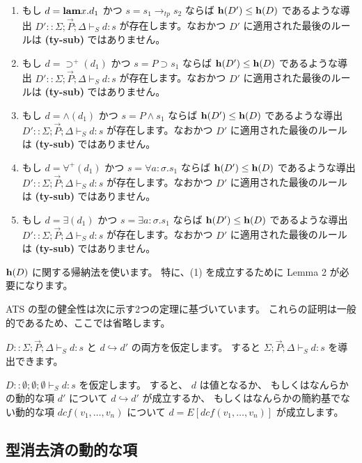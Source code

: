 \documentclass[submit,techreq,noauthor,onecolumn]{ipsj}
\begin{document}
\begin{enumerate}
  \item もし $d = {\bf lam} x.d_1$ かつ $s = s_1 \rightarrow_{tp} s_2$ ならば ${\bf h}(D') \leq {\bf h}(D)$ であるような導出 $D'::\Sigma; \vec{P}; \Delta \vdash_S d:s$ が存在します。なおかつ $D'$ に適用された最後のルールは {\bf (ty-sub)} ではありません。
  \item もし $d = \supset^+(d_1)$ かつ $s = P \supset s_1$ ならば ${\bf h}(D') \leq {\bf h}(D)$ であるような導出 $D' :: \Sigma; \vec{P}; \Delta \vdash_S d:s$ が存在します。なおかつ $D'$ に適用された最後のルールは {\bf (ty-sub)} ではありません。
  \item もし $d = \wedge(d_1)$ かつ $s = P \wedge s_1$ ならば ${\bf h}(D') \leq {\bf h}(D)$ であるような導出 $D' :: \Sigma; \vec{P}; \Delta \vdash_S d:s$ が存在します。なおかつ $D'$ に適用された最後のルールは {\bf (ty-sub)} ではありません。
  \item もし $d = \forall^+(d_1)$ かつ $s = \forall a:\sigma.s_1$ ならば ${\bf h}(D') \leq {\bf h}(D)$ であるような導出 $D' :: \Sigma; \vec{P}; \Delta \vdash_S d:s$ が存在します。なおかつ $D'$ に適用された最後のルールは {\bf (ty-sub)} ではありません。
  \item もし $d = \exists(d_1)$ かつ $s = \exists a:\sigma.s_1$ ならば ${\bf h}(D') \leq {\bf h}(D)$ であるような導出 $D' :: \Sigma; \vec{P}; \Delta \vdash_S d:s$ が存在します。なおかつ $D'$ に適用された最後のルールは {\bf (ty-sub)} ではありません。
\end{enumerate}

${\bf h}(D)$ に関する帰納法を使います。
特に、(1) を成立するために Lemma 2 が必要になります。

ATS の型の健全性は次に示す2つの定理に基づいています。
これらの証明は一般的であるため、ここでは省略します。

$D :: \Sigma; \vec{P}; \Delta \vdash_S d:s$ と $d \hookrightarrow d'$ の両方を仮定します。
すると $\Sigma; \vec{P}; \Delta \vdash_S d:s$ を導出できます。

$D :: \emptyset;\emptyset;\emptyset \vdash_S d:s$ を仮定します。
すると、 $d$ は値となるか、
もしくはなんらかの動的な項 $d'$ について $d \hookrightarrow d'$ が成立するか、
もしくはなんらかの簡約基でない動的な項 $dcf(v_1,\ldots,v_n)$ について $d = E[dcf(v_1,\ldots,v_n)]$ が成立します。

\subsection{型消去済の動的な項}
\end{document}
